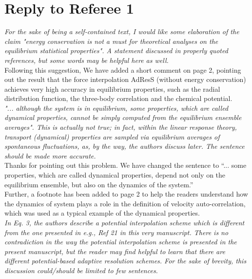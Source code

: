 \documentclass{article}
\begin{document}
\vskip 1cm
\newpage
\section*{Reply to Referee 1}

\noindent
\textit{For the sake of being a self-contained text, I would like some
elaboration of the claim "energy conservation is not a must for
theoretical analyses on the equilibrium statistical properties". A
statement discussed in properly quoted references, but some words may be
helpful here as well.}\\

\noindent
Following this suggestion, We have added a short comment on page 2, pointing out the result that
the force interpolation AdResS (without energy conservation) achieves very high accuracy in
equilibrium properties, such as the radial distribution function, the three-body correlation
and the chemical potential.\\


\noindent
\textit{"... although the system is in equilibrium, some properties, which are
called dynamical properties, cannot be simply computed from the
equilibrium ensemble averages". This is actually not true; in fact,
within the linear response theory, transport (dynamical) properties are
sampled via equilibrium averages of spontaneous fluctuations, as, by the
way, the authors discuss later.
The sentence should be made more accurate.
}\\

\noindent
Thanks for pointing out this problem. We have changed the sentence to
``... some properties, which are called dynamical properties,
depend not only on the equilibrium ensemble, but also on the dynamics of the system.''\\

\noindent
Further, a footnote has been added to page 2 to help the readers
understand how the dynamics of system plays a role in the definition
of velocity auto-correlation, which was used as a typical example of the  dynamical properties.
\\

\noindent
\textit{In Eq. 3, the authors describe a potential interpolation scheme which
is different from the one presented in e.g., Ref 21 in this very
manuscript. There is no contradiction in the way the potential
interpolation scheme is presented in the present manuscript, but the
reader may find helpful to learn that there are different
potential-based adaptive resolution schemes. For the sake of brevity,
this discussion could/should be limited to few sentences.}
\\
\end{document}
